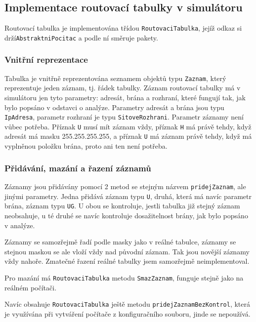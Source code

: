 \subsection{Implementace routovací tabulky v simulátoru}

Routovací tabulka je implementována třídou \verb|RoutovaciTabulka|, jejíž odkaz si drží\linebreak \verb|AbstraktniPocitac| a podle ní směruje pakety.

\subsubsection{Vnitřní reprezentace}

Tabulka je vnitřně reprezentována seznamem objektů typu \verb|Zaznam|, který reprezentuje jeden záznam, tj. řádek tabulky. Záznam routovací tabulky má v simulátoru jen tyto parametry: adresát, brána a rozhraní, které fungují tak, jak bylo popsáno v odstavci o analýze. Parametry adresát a brána jsou typu \verb|IpAdresa|, parametr rozhraní je typu \verb|SitoveRozhrani|. Parametr záznamy není vůbec potřeba. Příznak \verb|U| musí mít záznam vždy, příznak \verb|H| má právě tehdy, když adresát má masku 255.255.255.255, a příznak \verb|U| má záznam právě tehdy, když má vyplněnou položku brána, proto ani ten není potřeba.

\subsubsection{Přidávání, mazání a řazení záznamů}

Záznamy jsou přidávány pomocí 2 metod se stejným názvem \verb|pridejZaznam|, ale jinými parametry. Jedna přidává záznam typu \verb|U|, druhá, která má navíc parametr brána, záznam typu \verb|UG|. U obou se kontroluje, jestli tabulka již stejný záznam neobsahuje, u té druhé se navíc kontroluje dosažitelnost brány, jak bylo popsáno v analýze.

Záznamy se samozřejmě řadí podle masky jako v reálné tabulce, záznamy se stejnou maskou se ale vloží vždy nad původní záznam. Tak jsou novější záznamy vždy nahoře. Zmatečné řazení reálné tabulky jsem samozřejmě neimplementoval.

Pro mazání má \verb|RoutovaciTabulka| metodu \verb|SmazZaznam|, funguje stejně jako na reálném počítači.

Navíc obsahuje \verb|RoutovaciTabulka| ještě metodu \verb|pridejZaznamBezKontrol|, která je využívána při vytváření počítače z konfiguračního souboru, jinde se nepoužívá.

